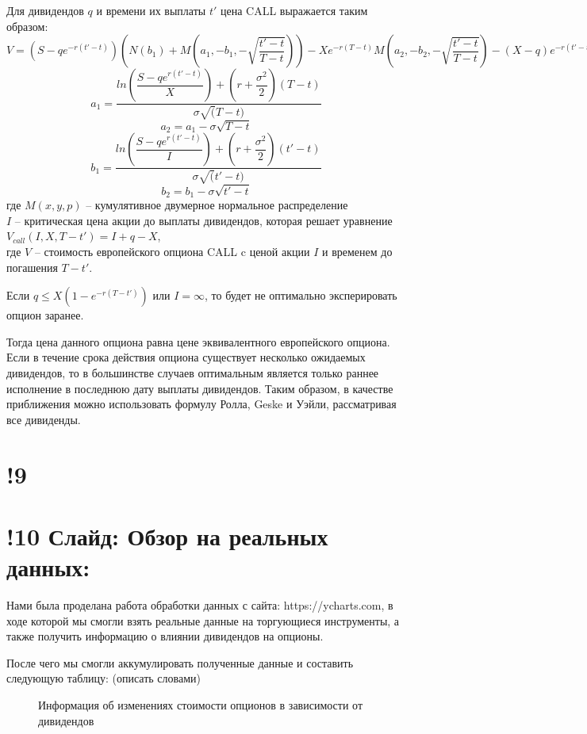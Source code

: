 \documentclass[a4paper]{article}
\begin{document}
Для дивидендов $q$ и времени их выплаты $t'$ цена CALL выражается таким образом:
$V = \left(S - qe^{-r (t' - t)} \right) \left( N(b_1) + M \left( a_1, -b_1, - \sqrt{ \dfrac{t' - t}{T - t}} \right) \right) - Xe^{-r (T - t)}  M \left( a_2, -b_2, - \sqrt{\dfrac{t' - t}{T - t}} \right) - (X - q) e^{-r (t' - t)} N(b_2)$
\[a_1 = \dfrac{ln \left( \dfrac{S - qe^{r(t' - t)}}{X}\right) + (r + \dfrac{\sigma^2}{2}) (T-t)}{\sigma \sqrt(T - t)}\]
\[a_2 = a_1 - \sigma \sqrt{T - t}\]
\[b_1 = \dfrac{ln \left( \dfrac{S - qe^{r(t' - t)}}{I}\right) + (r + \dfrac{\sigma^2}{2}) (t'-t)}{\sigma \sqrt(t' - t)}\]
\[b_2 = b_1 - \sigma \sqrt{t' - t}\]
где $M(x,y,p)$ -- кумулятивное двумерное нормальное распределение \\
$I$ -- критическая цена акции до выплаты дивидендов, которая решает уравнение $V_{call} (I, X, T - t') = I + q - X$, \\
где $V$ -- стоимость европейского опциона CALL c ценой акции $I$ и временем до погашения $T - t'$.

Если $q \leq X (1 - e ^{-r (T - t')})$ или $I = \infty$, то будет не оптимально эксперировать опцион заранее.

Тогда цена данного опциона равна цене эквивалентного европейского опциона. Если в течение срока действия опциона существует несколько ожидаемых дивидендов, то в большинстве случаев оптимальным является только раннее исполнение в последнюю дату выплаты дивидендов. Таким образом, в качестве приближения можно использовать формулу Ролла, Geske и Уэйли, рассматривая все дивиденды.
\section*{!9}
\section*{!10 Слайд: Обзор на реальных данных:}
Нами была проделана работа обработки данных с сайта: https://ycharts.com, в ходе которой мы смогли взять реальные данные на торгующиеся инструменты, а также получить информацию о влиянии дивидендов на опционы.

После чего мы смогли аккумулировать полученные данные и составить следующую таблицу: (описать словами)
\begin{figure}[h]
    \caption{Информация об изменениях стоимости опционов в зависимости от дивидендов}
    \label{fig:image}
\end{figure}
\end{document}

